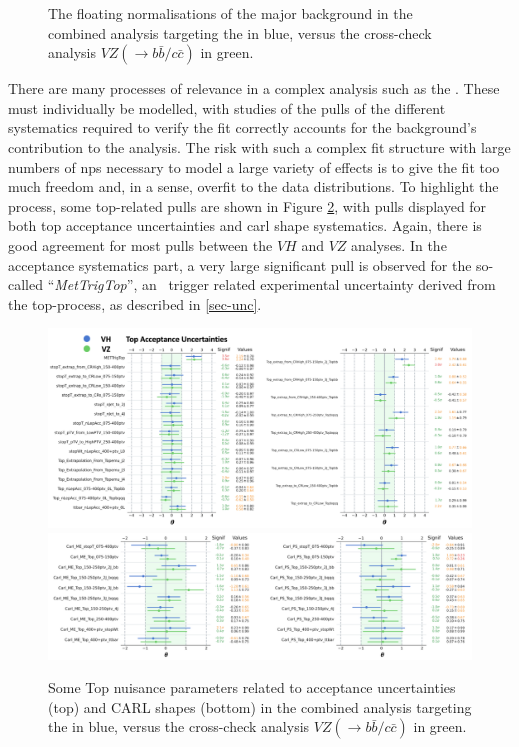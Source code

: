 \begin{figure}[h!]
    \caption{The floating normalisations of the major background in the combined analysis targeting the \vhbc in blue, versus the cross-check analysis $VZ(\rightarrow b\bar{b}/c\bar{c})$ in green.}
    \label{fig:FNback}
\end{figure} 

There are many processes of relevance in a complex analysis such as the \vhbc. These must individually be modelled, with studies of the pulls of the different systematics required to verify the fit correctly accounts for the background's contribution to the analysis. The risk with such a complex fit structure with large numbers of \gls{np}s necessary to model a large variety of effects is to give the fit too much freedom and, in a sense, overfit to the data distributions. To highlight the process, some top-related pulls are shown in Figure \ref{fig:topPull}, with pulls displayed for both top acceptance uncertainties and \gls{carl} shape systematics. Again, there is good agreement for most pulls between the $VH$ and $VZ$ analyses. In the acceptance systematics part, a very large significant pull is observed for the so-called ``\textit{MetTrigTop}'', an \etm\ trigger related experimental uncertainty derived from the top-process, as described in \ref{sec-unc}. 

\begin{figure}[h!]
    \centering
    \includegraphics[width=\textwidth]{Images/VH/Fit/fromSlides/FN/top1.png}\\
    \includegraphics[width=\textwidth]{Images/VH/Fit/fromSlides/FN/top2.png}
    \caption{Some Top nuisance parameters related to acceptance uncertainties (top) and CARL shapes (bottom) in the combined analysis targeting the \vhbc in blue, versus the cross-check analysis $VZ(\rightarrow b\bar{b}/c\bar{c})$ in green.}
    \label{fig:topPull}
\end{figure} 

